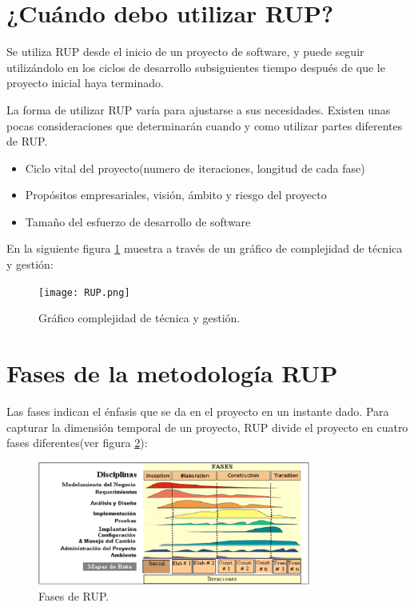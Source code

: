 \documentclass[spanish]{udpreport}
\begin{document}
\section{¿Cuándo debo utilizar RUP?}
\label{sec: Cuando debo utilizar RUP}
Se utiliza RUP desde el inicio de  un proyecto de software, y puede seguir utilizándolo en los ciclos de desarrollo subsiguientes tiempo después de que le proyecto inicial haya terminado. \par
La forma de utilizar RUP varía para ajustarse a sus necesidades. Existen unas pocas consideraciones que determinarán cuando y como utilizar partes diferentes de RUP.
\begin{itemize}
\item Ciclo vital del proyecto(numero de iteraciones, longitud de cada fase)
\item Propósitos empresariales, visión, ámbito y riesgo del proyecto
\item Tamaño del esfuerzo de desarrollo de software
\end{itemize}
En la siguiente figura \ref{fig:grafico} muestra a través de un gráfico de complejidad de técnica y gestión:

\begin{figure}[h]
	\centering
	\texttt{[image: RUP.png]}
	\caption{\label{fig:grafico}Gráfico complejidad de técnica y gestión.}
\end{figure}

\section{Fases de la metodología RUP}
Las fases indican el énfasis que se da en el proyecto en un instante dado. Para capturar la dimensión temporal de un proyecto, RUP divide el proyecto en cuatro fases diferentes(ver figura \ref{fig:fases}):

\begin{figure}[!h]
	\centering
	\includegraphics[width=0.8\textwidth]{fases.png}
	\caption{\label{fig:fases}Fases de RUP.}
\end{figure}
\end{document}
